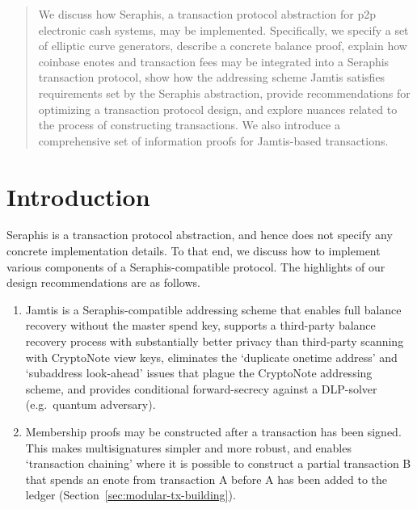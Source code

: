 \begin{abstract}
    We discuss how Seraphis, a transaction protocol abstraction for p2p electronic cash systems, may be implemented. Specifically, we specify a set of elliptic curve generators, describe a concrete balance proof, explain how coinbase enotes and transaction fees may be integrated into a Seraphis transaction protocol, show how the addressing scheme Jamtis satisfies requirements set by the Seraphis abstraction, provide recommendations for optimizing a transaction protocol design, and explore nuances related to the process of constructing transactions. We also introduce a comprehensive set of information proofs for Jamtis-based transactions.
\end{abstract}


\section{Introduction}
\label{sec:introduction}

Seraphis \cite{seraphis} is a transaction protocol abstraction, and hence does not specify any concrete implementation details. To that end, we discuss how to implement various components of a Seraphis-compatible protocol. The highlights of our design recommendations are as follows.

\begin{enumerate}
    \item Jamtis \cite{jamtis} is a Seraphis-compatible addressing scheme that enables full balance recovery without the master spend key, supports a third-party balance recovery process with substantially better privacy than third-party scanning with CryptoNote view keys, eliminates the `duplicate onetime address' and `subaddress look-ahead' issues that plague the CryptoNote addressing scheme, and provides conditional forward-secrecy against a DLP-solver (e.g.\ quantum adversary).
    \item Membership proofs may be constructed after a transaction has been signed. This makes multisignatures simpler and more robust, and enables `transaction chaining' where it is possible to construct a partial transaction B that spends an enote from transaction A before A has been added to the ledger (Section~\ref{sec:modular-tx-building}).
\end{enumerate}

